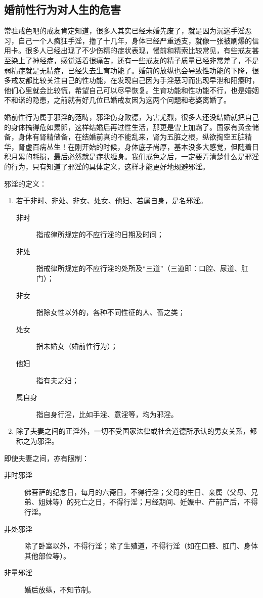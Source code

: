 \documentclass[fontset=founder]{ctexart}
\begin{document}
\subsection{婚前性行为对人生的危害}

常驻戒色吧的戒友肯定知道，很多人其实已经未婚先废了，就是因为沉迷手淫恶习，自己一个人疯狂手淫，撸了十几年，身体已经严重透支，就像一张被刷爆的信用卡。很多人已经出现了不少伤精的症状表现，慢前和精索比较常见，有些戒友甚至染上了神经症，感觉活着很痛苦，还有一些戒友的精子质量已经非常差了，不是弱精症就是无精症，已经失去生育功能了。婚前的放纵也会导致性功能的下降，很多戒友都比较关注自己的性功能，在发现自己因为手淫恶习而出现早泄和阳痿时，他们心里就会比较慌，希望自己可以尽早恢复。生育功能和性功能不行，也是婚姻不和谐的隐患，之前就有好几位已婚戒友因为这两个问题和老婆离婚了。

婚前性行为属于邪淫的范畴，邪淫伤身败德，为害尤烈，很多人还没结婚就把自己的身体搞得危如累卵，这样结婚后再过性生活，那更是雪上加霜了。国家有黄金储备，身体有肾精储备，在结婚前真的不能乱来，肾为五脏之根，纵欲掏空五脏精华，肾虚百病丛生！在刚开始的时候，身体底子尚厚，基本没多大感觉，但随着日积月累的耗损，最后必然就是症状缠身。我们戒色之后，一定要弄清楚什么是邪淫的行为，只有知道了邪淫的具体定义，这样才能更好地规避邪淫。

邪淫的定义：

\begin{enumerate}
    \item 若于非时、非处、非女、处女、他妇、若属自身，是名邪淫。\begin{description}
              \item[非时] 指戒律所规定的不应行淫的日期及时间；
              \item[非处] 指戒律所规定的不应行淫的处所及“三道”（三道即：口腔、尿道、肛门）；
              \item[非女] 指除女性以外的，各种不同性征的人、畜之类；
              \item[处女] 指未婚女（婚前性行为）；
              \item[他妇] 指有夫之妇；
              \item[属自身] 指自身行淫，比如手淫、意淫等，均为邪淫。
          \end{description}
    \item 除了夫妻之间的正淫外，一切不受国家法律或社会道德所承认的男女关系，都称之为邪淫。
\end{enumerate}

即使夫妻之间，亦有限制：

\begin{description}
    \item[非时邪淫] 佛菩萨的纪念日，每月的六斋日，不得行淫；父母的生日、亲属（父母、兄弟、姐妹等）的死亡之日，不得行淫；月经期间、妊娠中、产前产后，不得行淫。
    \item[非处邪淫] 除了卧室以外，不得行淫；除了生殖道，不得行淫（如在口腔、肛门、身体其他部位等）。
    \item[非量邪淫] 婚后放纵，不知节制。
\end{description}
\end{document}

